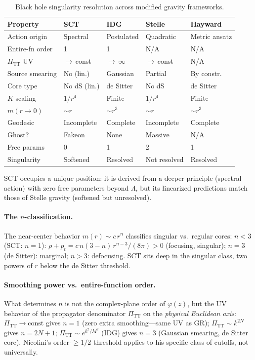\documentclass[11pt,a4paper]{article}
\theoremstyle{definition}
\theoremstyle{remark}
\newcommand{\Lam}{\Lambda}
\newcommand{\PiTT}{\Pi_{\mathrm{TT}}}
\begin{document}
\begin{table}[htbp]
\centering
\caption{Black hole singularity resolution across modified gravity frameworks.}
\label{tab:comparison}
\small
\begin{tabular}{@{}lllll@{}}
\toprule
Property & SCT & IDG & Stelle & Hayward \\
\midrule
Action origin & Spectral & Postulated & Quadratic & Metric ansatz \\
Entire-fn order & 1 & 1 & N/A & N/A \\
$\PiTT$ UV & $\to\,$const & $\to\,\infty$ & $\to\,$const & N/A \\
Source smearing & No (lin.) & Gaussian & Partial & By constr. \\
Core type & No dS (lin.) & de Sitter & No dS & de Sitter \\
$K$ scaling & $1/r^4$ & Finite & $1/r^4$ & Finite \\
$m(r\to 0)$ & $\sim r$ & $\sim r^3$ & $\sim r$ & $\sim r^3$ \\
Geodesic & Incomplete & Complete & Incomplete & Complete \\
Ghost? & Fakeon & None & Massive & N/A \\
Free params & 0 & 1 & 2 & 1 \\
Singularity & Softened & Resolved & Not resolved & Resolved \\
\bottomrule
\end{tabular}
\end{table}

SCT occupies a unique position: it is derived from a deeper principle (spectral action)
with zero free parameters beyond $\Lam$, but its linearized predictions match those of
Stelle gravity (softened but unresolved).

\paragraph{The $n$-classification.}
The near-center behavior $m(r) \sim c\,r^n$ classifies singular vs.\ regular cores:
$n < 3$ (SCT: $n = 1$): $\rho + p_t = c\,n(3-n)\,r^{n-3}/(8\pi) > 0$ (focusing,
singular); $n = 3$ (de Sitter): marginal; $n > 3$: defocusing.  SCT sits deep in the
singular class, two powers of $r$ below the de Sitter threshold.

\paragraph{Smoothing power vs.\ entire-function order.}
What determines $n$ is not the complex-plane order of $\varphi(z)$, but the UV
behavior of the propagator denominator $\PiTT$ on the \emph{physical Euclidean axis}:
$\PiTT \to \mathrm{const}$ gives $n = 1$ (zero extra smoothing---same UV as GR);
$\PiTT \sim k^{2N}$ gives $n = 2N + 1$;
$\PiTT \sim e^{k^2/M^2}$ (IDG) gives $n = 3$ (Gaussian smearing, de Sitter core).
Nicolini's order-$\geq 1/2$ threshold applies to his specific class of cutoffs, not
universally.
\end{document}
